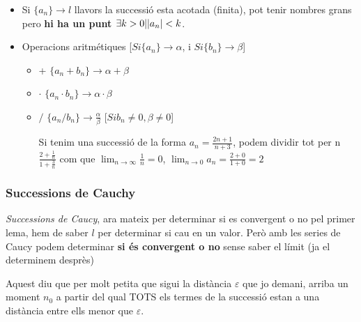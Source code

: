 \documentclass[12pt]{article}
\begin{document}
\begin{itemize}
    \item Si $\{a_n\} \rightarrow l$ llavors la successió esta acotada (finita), pot tenir nombres grans pero \textbf{hi ha un punt $\exists k > 0 | \abs{a_n} < k$}.
    \item Operacions aritmétiques [$Si \{a_n\} \rightarrow \alpha$, i $Si \{b_n\} \rightarrow \beta$]
    \begin{itemize}
        \item + $\{a_n + b_n\} \rightarrow \alpha + \beta$
        \item $\cdot$ $\{a_n \cdot b_n\} \rightarrow \alpha \cdot \beta$
        \item $/$ $\{a_n / b_n\} \rightarrow \frac{\alpha}{\beta}$ [$Si b_n \neq 0, \beta \neq 0$]
        \begin{examplebox}{}
            Si tenim una successió de la forma $a_n = \frac{2n+1}{n+3}$, podem dividir tot per n $\frac{2+\frac{1}{n}}{1+\frac{3}{n}}$ com que $\lim_{n\rightarrow \infty} \frac{1}{n} = 0$, $\lim_{n\rightarrow 0} a_n = \frac{2+0}{1+0} = 2$
        \end{examplebox}
    \end{itemize}
\end{itemize}

\subsubsection{Successions de Cauchy}

 \textit{Successions de Caucy}, ara mateix per determinar si es convergent o no pel primer lema, hem de saber $l$ per determinar si cau en un valor. Però amb les series de Caucy podem determinar \textbf{si és convergent o no} sense saber el límit (ja el determinem desprès)

    Aquest diu que per molt petita que sigui la distància \(\varepsilon\) que jo demani, arriba un moment \(n_0\) a partir del qual TOTS els termes de la successió estan a una distància entre ells menor que \(\varepsilon\).
    
\end{document}
